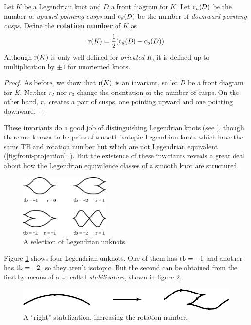 \begin{defn}
    Let $K$ be a Legendrian knot and $D$ a front diagram for $K$. Let $\operatorname{c}_u(D)$ be the number of \emph{upward-pointing cusps} and $\operatorname{c}_d(D)$ be the number of \emph{downward-pointing cusps}. Define the \textbf{rotation number} of $K$ as 
    \[
        \operatorname{r}(K) = \frac{1}{2} (\operatorname{c}_d(D) - \operatorname{c}_u(D))
    \]
    Although $\operatorname{r}(K)$ is only well-defined for \emph{oriented} $K$, it is defined up to multiplication by $\pm 1$ for unoriented knots.
\end{defn}
\begin{proof}
    As before, we show that $\operatorname{r}(K)$ is an invariant, so let $D$ be a front diagram for $K$. Neither $r_2$ nor $r_3$ change the orientation or the number of cusps. On the other hand, $r_1$ creates a pair of cusps, one pointing upward and one pointing downward.
\end{proof}

These invariants do a good job of distinguishing Legendrian knots (see \cite{eliashberg2008unknot}), though there are known to be pairs of smooth-isotopic Legendrian knots which have the same TB and rotation number but which are not Legendrian equivalent (\ref{fig:front-projection}, \cite{chekanov}). But the existence of these invariants reveals a great deal about how the Legendrian equivalence classes of a smooth knot are structured. 

\begin{figure}[ht]
    \centering
    \includegraphics[width=0.4\textwidth]{images/unknots.pdf}
    \caption{A selection of Legendrian unknots.}%
    \label{fig:unknots}
\end{figure}

Figure \ref{fig:unknots} shows four Legendrian unknots. One of them has $\operatorname{tb} = -1$ and another has $\operatorname{tb} = -2$, so they aren't isotopic. But the second can be obtained from the first by means of a so-called \emph{stabilization}, shown in figure \ref{fig:stabilization}. 

\begin{figure}[ht]
    \centering
    \includegraphics[width=0.6\linewidth]{images/stabilization.pdf}
    \caption{A ``right'' stabilization, increasing the rotation number.}%
    \label{fig:stabilization}
\end{figure}

